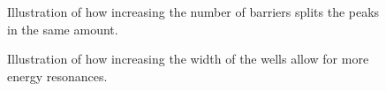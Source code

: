 \documentclass[12pt,a4paper,onecolumn]{article}
\theoremstyle{definition}
\theoremstyle{plain}
\begin{document}
\begin{figure}[H]
\centering
	\caption{Illustration of how increasing the number of barriers splits the peaks in the same amount.} 
	\label{fig:peak_split}
\end{figure}

\begin{figure}[H]
\centering
	\caption{Illustration of how increasing the width of the wells allow for more energy resonances.} 
	\label{fig:peak_increase}
\end{figure}
\end{document}
